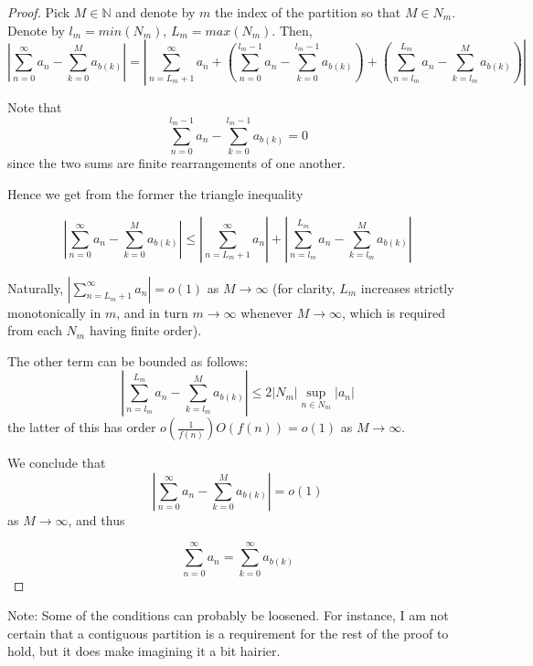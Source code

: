 \documentclass{article}
\begin{document}
	\begin{proof}
	
	
	
	
	Pick $M \in \mathbb{N}$ and denote by $m$ the index of the partition so that $M \in N_m$. Denote by $l_m = min \left( N_m \right)$, $L_m = max \left( N_m \right)$. Then,
	$$ \left| \sum_{n=0}^{\infty} a_n - \sum_{k=0}^{M} a_{b(k)} \right| = \left| \sum_{n=L_m+1}^{\infty} a_n + \left( \sum_{n=0}^{l_m-1} a_n - \sum_{k=0}^{l_m-1} a_{b(k)} \right) + \left( \sum_{n=l_m}^{L_m} a_n - \sum_{k=l_m}^{M} a_{b(k)} \right) \right| $$
	
	Note that $$ \sum_{n=0}^{l_m-1} a_n - \sum_{k=0}^{l_m-1} a_{b(k)} = 0 $$ since the two sums are finite rearrangements of one another.
	
	Hence we get from the former the triangle inequality
	
	$$ \left| \sum_{n=0}^{\infty} a_n - \sum_{k=0}^{M} a_{b(k)} \right| \leq \left| \sum_{n=L_m+1}^{\infty} a_n \right| + \left| \sum_{n=l_m}^{L_m} a_n - \sum_{k=l_m}^{M} a_{b(k)} \right| $$
	
	Naturally, $ \left| \sum_{n=L_m+1}^{\infty} a_n \right| = o(1)$ as $M \rightarrow \infty$ (for clarity, $L_m$ increases strictly monotonically in $m$, and in turn $m \rightarrow \infty$ whenever $M \rightarrow \infty$, which is required from each $N_m$ having finite order).
	
	The other term can be bounded as follows:
	$$\left| \sum_{n=l_m}^{L_m} a_n - \sum_{k=l_m}^{M} a_{b(k)} \right| \leq 2 \left| N_m \right| \sup_{n \in N_m} \left| a_n \right|$$
	the latter of this has order
	$ o\left(\frac{1}{f(n)} \right) O( f(n) ) = o(1) $ as $ M \rightarrow \infty $. \newline
	
	We conclude that $$ \left|  \sum_{n=0}^{\infty} a_n - \sum_{k=0}^{M} a_{b(k)} \right| = o(1) $$ as $M \rightarrow \infty$, and thus
	
	$$ \sum_{n=0}^{\infty} a_n = \sum_{k=0}^{\infty} a_{b(k)} $$
	
	\end{proof}
	
	
	Note: Some of the conditions can probably be loosened. For instance, I am not certain that a contiguous partition is a requirement for the rest of the proof to hold, but it does make imagining it a bit hairier. 
	
\end{document}

